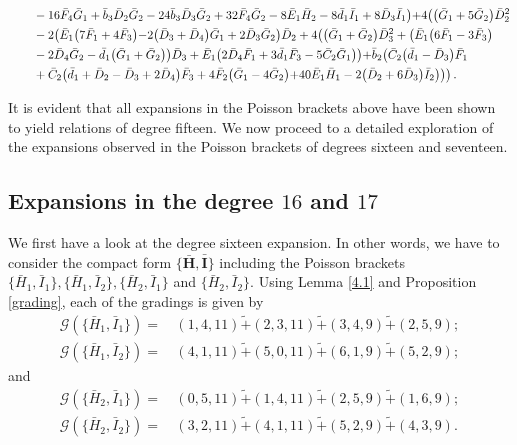 \documentclass[10pt]{amsart}
\theoremstyle{definition}
\theoremstyle{corollary}
\theoremstyle{remark}
\theoremstyle{conclusion}
\begin{document}
\begin{align}
& \hskip 0.7cm-16 \bar{F}_4 \bar{G}_1+\bar{b}_3 \bar{D}_2 \bar{G}_2-24 \bar{b}_3 \bar{D}_3 \bar{G}_2+32\bar{F}_4 \bar{G}_2-8 \bar{E}_1 \bar{H}_2-8 \bar{d}_1 \bar{I}_1+8 \bar{D}_3 \bar{I}_1\bigl)+4 \bigl(\bigl(\bar{G}_1+5 \bar{G}_2\bigl) \bar{D}_2^2 \nonumber \\
& \hskip 0.7cm-2 \bigl(\bar{E}_1 \bigl(7 \bar{F}_1+4 \bar{F}_3\bigl)-2 \bigl(\bar{D}_3+\bar{D}_4\bigl) \bar{G}_1+2 \bar{D}_3 \bar{G}_2\bigl) \bar{D}_2+4 \bigl(\bigl(\bar{G}_1+\bar{G}_2\bigl) \bar{D}_3^2+\bigl(\bar{E}_1 \bigl(6 \bar{F}_1-3 \bar{F}_3\bigl)\nonumber \\
& \hskip 0.7cm-2 \bar{D}_4 \bar{G}_2-\bar{d}_1 \bigl(\bar{G}_1+\bar{G}_2\bigl)\bigl) \bar{D}_3+\bar{E}_1 \bigl(2 \bar{D}_4 \bar{F}_1+3 \bar{d}_1 \bar{F}_3-5 \bar{C}_2 \bar{G}_1\bigl)\bigl)+\bar{b}_2 \bigl(\bar{C}_2 \bigl(\bar{d}_1-\bar{D}_3\bigl) \bar{F}_1 \nonumber \\
& \hskip 0.7cm+\bar{C}_2 \bigl(\bar{d}_1+\bar{D}_2-\bar{D}_3+2 \bar{D}_4\bigl) \bar{F}_3+4 \bar{F}_2 \bigl(\bar{G}_1-4 \bar{G}_2\bigl)+40 \bar{E}_1 \bar{H}_1-2 \bigl(\bar{D}_2+6 \bar{D}_3\bigl) \bar{I}_2\bigl)\bigl)\bigl) \, .
\end{align}

It is evident that all expansions in the Poisson brackets above have been shown to yield relations of degree fifteen. We now proceed to a detailed exploration of the expansions observed in the Poisson brackets of degrees sixteen and seventeen.

\subsection{Expansions in the degree $16$ and $17$}

 We first have a look at the degree sixteen expansion. In other words, we have to consider the compact form $\{\bar{\textbf{H}},\bar{\textbf{I}}\}$ including the Poisson brackets $\{\bar{H}_1,\bar{I}_1\},\{\bar{H}_1,\bar{I}_2\} ,\{\bar{H}_2,\bar{I}_1\}$ and $ \{\bar{H}_2,\bar{I}_2\}.$ Using Lemma \ref{4.1} and Proposition \ref{grading}, each of the gradings is given by
\begin{align*}
         \mathcal{G} \left(\{\bar{H}_1,\bar{I}_1\}\right) =& \, (1,4,11) \tilde{+} (2,3,11) \tilde{+}(3,4,9) \tilde{+} (2,5,9)  ; \\
    \mathcal{G} \left(\{\bar{H}_1,\bar{I}_2\}\right) =& \, (4,1,11) \tilde{+} (5,0,11) \tilde{+}(6,1,9) \tilde{+} (5,2,9)  ;
    \end{align*} and \begin{align*}
    \mathcal{G} \left(\{\bar{H}_2,\bar{I}_1\}\right) =& \,  (0,5,11) \tilde{+} (1,4,11) \tilde{+}(2,5,9) \tilde{+} (1,6,9)   ; \\
      \mathcal{G} \left(\{\bar{H}_2,\bar{I}_2\}\right) =& \, (3,2,11) \tilde{+} (4,1,11) \tilde{+}(5,2,9) \tilde{+} (4,3,9).
\end{align*} 
\end{document}
